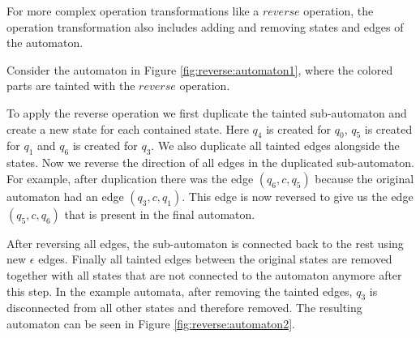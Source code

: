 For more complex operation transformations like a $reverse$ operation, the operation transformation also includes adding and removing states and edges of the automaton.

Consider the automaton in Figure \ref{fig:reverse:automaton1}, where the colored parts are tainted with the $reverse$ operation.

To apply the reverse operation we first duplicate the tainted sub-automaton and create a new state for each contained state. Here $q_4$ is created for $q_0$, $q_5$ is created for $q_1$ and $q_6$ is created for $q_3$. We also duplicate all tainted edges alongside the states.
Now we reverse the direction of all edges in the duplicated sub-automaton.
For example, after duplication there was the edge $(q_6, c, q_5)$ because the original automaton had an edge $(q_3,c,q_1)$. This edge is now reversed to give us the edge $(q_5, c, q_6)$ that is present in the final automaton.

After reversing all edges, the sub-automaton is connected back to the rest using new $\epsilon$ edges.
Finally all tainted edges between the original states are removed together with all states that are not connected to the automaton anymore after this step.
In the example automata, after removing the tainted edges, $q_3$ is disconnected from all other states and therefore removed.
The resulting automaton can be seen in Figure \ref{fig:reverse:automaton2}.

